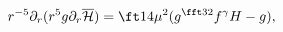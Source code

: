 \begin{equation}
r^{-5}\partial_r(r^5g\partial_r\overline{\cal H})=\ft14\mu^2(g^{\fft32}
f^\gamma H-g),
\end{equation}

